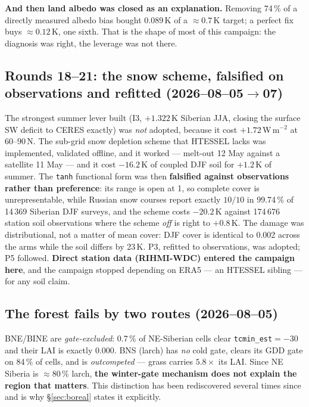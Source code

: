 \documentclass[10pt]{article}
\begin{document}
\textbf{And then land albedo was closed as an explanation.} Removing 74\,\% of a directly
measured albedo bias bought $0.089$\,K of a ${\approx}0.7$\,K target; a perfect fix buys
${\approx}0.12$\,K, one sixth. That is the shape of most of this campaign: the diagnosis was
right, the leverage was not there.

\subsection{Rounds 18--21: the snow scheme, falsified on observations and refitted
(2026--08--05$\to$07)}

The strongest summer lever built (I3, $+1.322$\,K Siberian JJA, closing the surface SW
deficit to CERES exactly) was \emph{not} adopted, because it cost $+1.72$\,W\,m$^{-2}$ at
60--90\,N. The sub-grid snow depletion scheme that HTESSEL lacks was implemented, validated
offline, and it worked --- melt-out 12 May against a satellite 11 May --- and it cost
$-16.2$\,K of coupled DJF soil for $+1.2$\,K of summer. The \texttt{tanh} functional form
was then \textbf{falsified against observations rather than preference}: its range is open
at 1, so complete cover is unrepresentable, while Russian snow courses report exactly
$10/10$ in 99.74\,\% of 14\,369 Siberian DJF surveys, and the scheme costs $-20.2$\,K
against 174\,676 station soil observations where the scheme \emph{off} is right to
$+0.8$\,K. The damage was distributional, not a matter of mean cover: DJF cover is identical
to 0.002 across the arms while the soil differs by 23\,K. P3, refitted to observations, was
adopted; P5 followed. \textbf{Direct station data (RIHMI-WDC) entered the campaign here},
and the campaign stopped depending on ERA5 --- an HTESSEL sibling --- for any soil claim.

\subsection{The forest fails by two routes (2026--08--05)}

BNE/BINE are \emph{gate-excluded}: 0.7\,\% of NE-Siberian cells clear
\texttt{tcmin\_est}$=-30$ and their LAI is exactly 0.000. BNS (larch) has \emph{no} cold
gate, clears its GDD gate on 84\,\% of cells, and is \emph{outcompeted} --- grass carries
$5.8\times$ its LAI. Since NE Siberia is ${\approx}80\,\%$ larch, \textbf{the winter-gate
mechanism does not explain the region that matters}. This distinction has been rediscovered
several times since and is why \S\ref{sec:boreal} states it explicitly.
\end{document}
